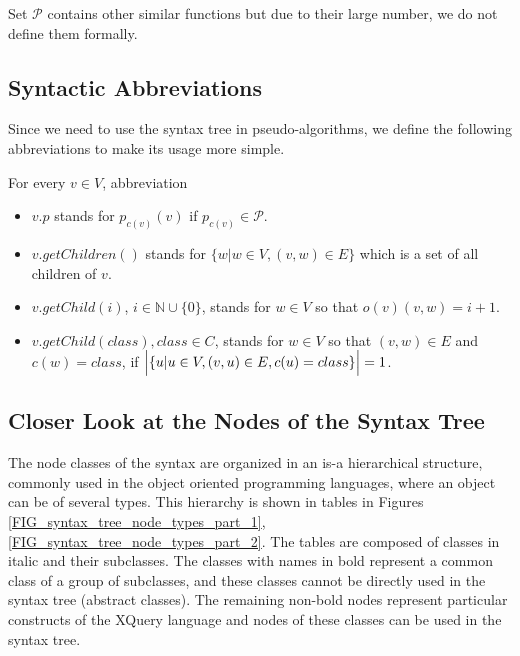 Set $\mathcal{P}$ contains other similar functions but due to their large number, we do not define them formally.


\subsection{Syntactic Abbreviations}
Since we need to use the syntax tree in pseudo-algorithms, we define the following abbreviations to make its usage more simple.

For every $v \in V$, abbreviation
\begin{itemize}
\item $v.p$ stands for $p_{c(v)}(v)$ if $p_{c(v)} \in \mathcal{P}$.
\item $v.getChildren()$ stands for $\{w | w \in V, (v,w) \in E\}$ which is a set of all children of $v$.
\item $v.getChild(i)$, $i \in \mathbb{N} \cup \{0\}$, stands for $w \in V$ so that $o(v)(v,w) = i + 1$.
\item $v.getChild(class), class \in C$, stands for $w \in V$ so that $(v,w) \in E$ and $c(w) = class$, if $\Bigl | \{u | u \in V, (v,u) \in E, c(u) = class\}\Bigr | = 1$.
\end{itemize}


\subsection{Closer Look at the Nodes of the Syntax Tree}
The node classes of the syntax are organized in an is-a hierarchical structure, commonly used in the object oriented programming languages, where an object can be of several types. This hierarchy is shown in tables in Figures \ref{FIG_syntax_tree_node_types_part_1}, \ref{FIG_syntax_tree_node_types_part_2}. The tables are composed of classes in italic and their subclasses. The classes with names in bold represent a common class of a group of subclasses, and these classes cannot be directly used in the syntax tree (abstract classes). The remaining non-bold nodes represent particular constructs of the XQuery language and nodes of these classes can be used in the syntax tree. 

